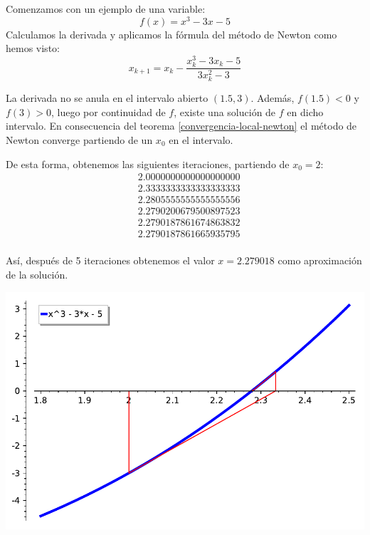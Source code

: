 \begin{example}
	
Comenzamos con un ejemplo de una variable:
$$f(x) = x^3 - 3x - 5$$
Calculamos la derivada y aplicamos la fórmula del método de Newton como hemos visto:
$$x_{k+1} = x_{k} - \frac{ x_k^3 - 3x_k - 5}{3x_k^2-3}$$

La derivada no se anula en el intervalo abierto $(1.5, 3)$.
Además, $f(1.5)<0$ y $f(3)>0$, luego por continuidad de $f$, existe una solución de $f$ en dicho intervalo.
En consecuencia del teorema \ref{convergencia-local-newton} el método de Newton converge partiendo de un $x_0$ en el intervalo.

De esta forma, obtenemos las siguientes iteraciones, partiendo de $x_0 = 2$:
\begin{equation}
	\begin{matrix}
		&2.0000000000000000000 \\
		&2.3333333333333333333 \\
		&2.2805555555555555556 \\
		&2.2790200679500897523 \\
		&2.2790187861674863832 \\
		&2.2790187861665935795 \\
	\end{matrix}
\end{equation}

Así, después de 5 iteraciones obtenemos el valor $x = 2.279018$ como aproximación de la solución.
\begin{center}
	\includegraphics[scale=1]{imagenes/ejemplo1_newton.pdf}
\end{center}


\end{example}

